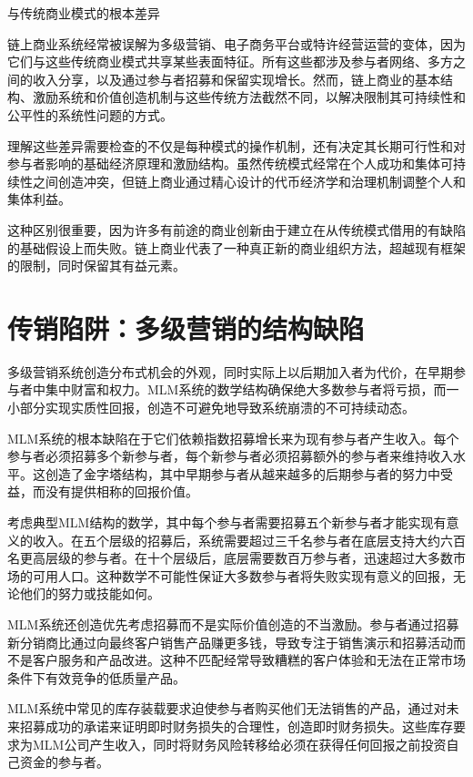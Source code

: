 \documentclass[
  Letterpaper,
]{scrbook}
\begin{document}
与传统商业模式的根本差异

链上商业系统经常被误解为多级营销、电子商务平台或特许经营运营的变体，因为它们与这些传统商业模式共享某些表面特征。所有这些都涉及参与者网络、多方之间的收入分享，以及通过参与者招募和保留实现增长。然而，链上商业的基本结构、激励系统和价值创造机制与这些传统方法截然不同，以解决限制其可持续性和公平性的系统性问题的方式。

理解这些差异需要检查的不仅是每种模式的操作机制，还有决定其长期可行性和对参与者影响的基础经济原理和激励结构。虽然传统模式经常在个人成功和集体可持续性之间创造冲突，但链上商业通过精心设计的代币经济学和治理机制调整个人和集体利益。

这种区别很重要，因为许多有前途的商业创新由于建立在从传统模式借用的有缺陷的基础假设上而失败。链上商业代表了一种真正新的商业组织方法，超越现有框架的限制，同时保留其有益元素。

\section{传销陷阱：多级营销的结构缺陷}\label{ux4f20ux9500ux9677ux9631ux591aux7ea7ux8425ux9500ux7684ux7ed3ux6784ux7f3aux9677}

多级营销系统创造分布式机会的外观，同时实际上以后期加入者为代价，在早期参与者中集中财富和权力。MLM系统的数学结构确保绝大多数参与者将亏损，而一小部分实现实质性回报，创造不可避免地导致系统崩溃的不可持续动态。

MLM系统的根本缺陷在于它们依赖指数招募增长来为现有参与者产生收入。每个参与者必须招募多个新参与者，每个新参与者必须招募额外的参与者来维持收入水平。这创造了金字塔结构，其中早期参与者从越来越多的后期参与者的努力中受益，而没有提供相称的回报价值。

考虑典型MLM结构的数学，其中每个参与者需要招募五个新参与者才能实现有意义的收入。在五个层级的招募后，系统需要超过三千名参与者在底层支持大约六百名更高层级的参与者。在十个层级后，底层需要数百万参与者，迅速超过大多数市场的可用人口。这种数学不可能性保证大多数参与者将失败实现有意义的回报，无论他们的努力或技能如何。

MLM系统还创造优先考虑招募而不是实际价值创造的不当激励。参与者通过招募新分销商比通过向最终客户销售产品赚更多钱，导致专注于销售演示和招募活动而不是客户服务和产品改进。这种不匹配经常导致糟糕的客户体验和无法在正常市场条件下有效竞争的低质量产品。

MLM系统中常见的库存装载要求迫使参与者购买他们无法销售的产品，通过对未来招募成功的承诺来证明即时财务损失的合理性，创造即时财务损失。这些库存要求为MLM公司产生收入，同时将财务风险转移给必须在获得任何回报之前投资自己资金的参与者。
\end{document}
